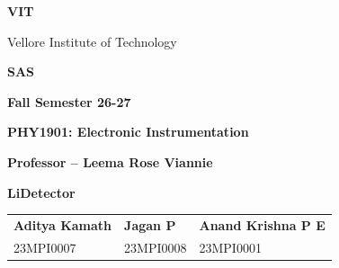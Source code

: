 \documentclass[12pt,a4paper]{article}
\begin{document}
\begin{titlepage}
\thispagestyle{fancy}
\centering

\vspace*{0.8cm}

{\Huge\textbf{VIT}\par}
\vspace{0.2cm}
{\large Vellore Institute of Technology\par}


\vspace{0.8cm}

{\large\textbf{SAS}\par}

\vspace{0.6cm}

{\large\textbf{Fall Semester 26-27}\par}

\vspace{1cm}

{\Large\bfseries
PHY1901: Electronic Instrumentation\par}

\vspace{0.8cm}

{\large\bfseries
Professor -- Leema Rose Viannie\par}

\vspace{1cm}

{\Large\bfseries
LiDetector\par}

\vspace{1.3cm}

\begin{tabularx}{\textwidth}{
  >{\centering\arraybackslash}X
  >{\centering\arraybackslash}X
  >{\centering\arraybackslash}X}

\textbf{Aditya Kamath} &
\textbf{Jagan P} &
\textbf{Anand Krishna P E}\\

23MPI0007 &
23MPI0008 &
23MPI0001\\[0.7cm]

\end{tabularx}

\vfill
\end{titlepage}

\clearpage
\thispagestyle{fancy}

\vspace*{1cm}
\end{document}
